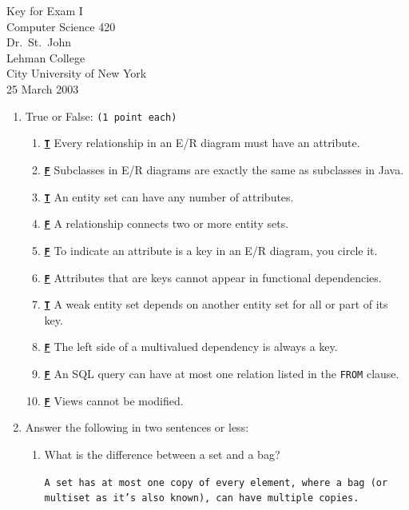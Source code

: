 \documentclass[12pt]{article}
\begin{document}
{%
\begin{center}
    Key for Exam I\\
    Computer Science 420 \\
    Dr.~St.~John\\ 
    Lehman College\\
    City University of New York\\ 
    25 March 2003
\end{center}
}

\begin{enumerate}

    \item True or False:  {\tt(1 point each)}
    \begin{enumerate}
        \item \underline{\tt\bf T} Every relationship in an E/R diagram must have an attribute.
        \item \underline{\tt\bf F} Subclasses in E/R diagrams are exactly the same as subclasses in Java. 
        \item \underline{\tt\bf T} An entity set can have any number of attributes.
        \item \underline{\tt\bf F}  A relationship connects two or more entity sets.
        \item \underline{\tt\bf F}  To indicate an attribute is a key in an E/R diagram, you circle it.
        \item \underline{\tt\bf F} Attributes that are keys cannot 
		appear in functional dependencies.
        \item \underline{\tt\bf T} A weak entity set depends on another entity set for all or part of its key.
        \item \underline{\tt\bf F} The left side of a multivalued dependency is always a key.
        \item \underline{\tt\bf F} An SQL query can have at most one relation listed in the 
		{\tt FROM} clause.
        \item \underline{\tt\bf F} Views cannot be modified.
    \end{enumerate}

\item Answer the following in two sentences or less:
\begin{enumerate}
    \item What is the difference between a set and a bag?
	\\
	{\tt  A set has at most one copy of every element, where a bag (or multiset as it's also known),
	can have multiple copies.
	
}
\end{enumerate}
\end{enumerate}
\end{document}
